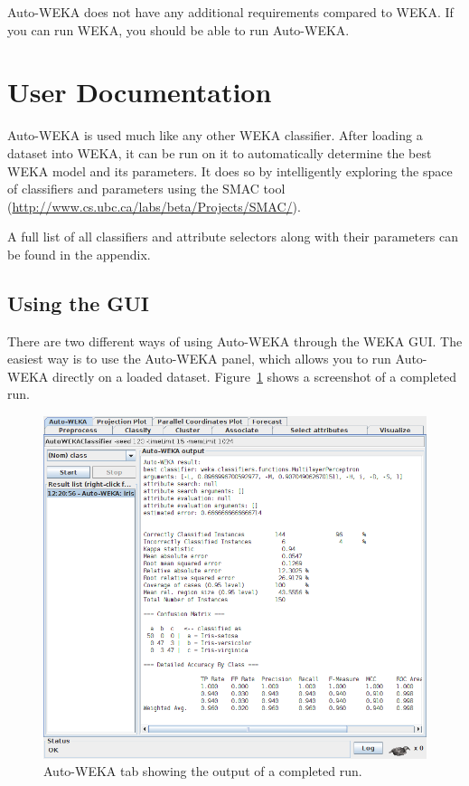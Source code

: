 \documentclass{article}
\begin{document}
Auto-WEKA does not have any additional requirements compared to WEKA. If you can
run WEKA, you should be able to run Auto-WEKA.

\section{User Documentation}\label{sec:overview}

Auto-WEKA is used much like any other WEKA classifier. After loading a dataset
into WEKA, it can be run on it to automatically determine the best WEKA model
and its parameters. It does so by intelligently exploring the space of
classifiers and parameters using the SMAC tool (\url{http://www.cs.ubc.ca/labs/beta/Projects/SMAC/}).

A full list of all classifiers and attribute selectors along with their
parameters can be found in the appendix.

\subsection{Using the GUI}\label{sec:gui}

There are two different ways of using Auto-WEKA through the WEKA GUI. The
easiest way is to use the Auto-WEKA panel, which allows you to run Auto-WEKA
directly on a loaded dataset. Figure~\ref{fig:tab} shows a screenshot of a
completed run.

\begin{figure}[!ht]
\begin{center}
\includegraphics[width=.8\textwidth]{tab}
\caption{Auto-WEKA tab showing the output of a completed run.}
\label{fig:tab}
\end{center}
\end{figure}
\end{document}

